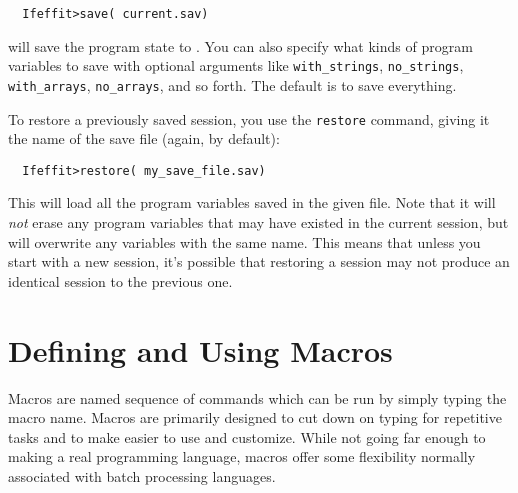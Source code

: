 \documentclass[11pt]{article}
\begin{document}
{\small\begin{verbatim}
  Ifeffit>save( current.sav)
\end{verbatim}}\noindent
will save the program state to {}.  You can also specify
what kinds of program variables to save with optional arguments like
{\tt{with\_strings}}, {\tt{no\_strings}}, {\tt{with\_arrays}},
{\tt{no\_arrays}}, and so forth.  The default is to save everything.

To restore a previously saved session, you use the {\tt{restore}} command,
giving it the name of the save file (again, {\/}  by
default):
{\small\begin{verbatim}
  Ifeffit>restore( my_save_file.sav)
\end{verbatim}}\noindent
This will load all the program variables saved in the given file. Note that
it will {\emph{not}} erase any program variables that may have existed in
the current session, but will overwrite any variables with the same name.
This means that unless you start with a new session, it's possible that
restoring a session may not produce an identical session to the previous
one.

\clearpage
\section{Defining and Using Macros}\label{s:macros}

Macros are named sequence of {\ifeffit} commands which can be run by simply
typing the macro name.  Macros are primarily designed to cut down on typing
for repetitive tasks and to make {\ifeffit} easier to use and customize.
While not going far enough to making {\ifeffit} a real programming
language, macros offer some flexibility normally associated with batch
processing languages.
\end{document}
